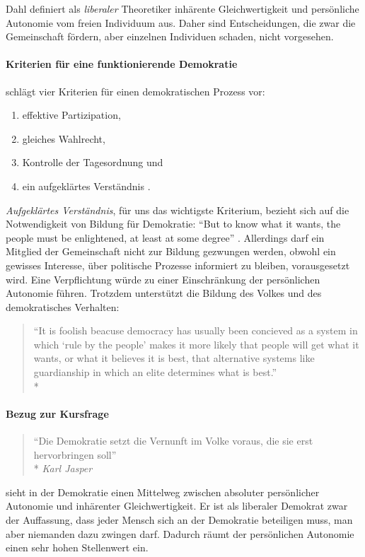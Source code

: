 Dahl definiert als \emph{liberaler} Theoretiker inhärente Gleichwertigkeit und persönliche Autonomie vom freien Individuum aus.
Daher sind Entscheidungen, die zwar die Gemeinschaft fördern, aber einzelnen Individuen schaden, nicht vorgesehen.


\paragraph{Kriterien für eine funktionierende Demokratie}

\citeauthor{Dahl-1989-aa} schlägt vier Kriterien für einen demokratischen Prozess vor:

\begin{enumerate}
	\item effektive Partizipation,
	\item gleiches Wahlrecht,
	\item Kontrolle der Tagesordnung und
	\item ein aufgeklärtes Verständnis \parencite[vgl.][100]{Dahl-1989-aa}.
\end{enumerate}

\emph{Aufgeklärtes Verständnis}, für uns das wichtigste Kriterium, bezieht sich auf die Notwendigkeit von Bildung für Demokratie:
``But to know what it wants, the people must be enlightened, at least at some degree'' \parencite[100]{Dahl-1989-aa}.
Allerdings darf ein Mitglied der Gemeinschaft nicht zur Bildung gezwungen werden, obwohl ein gewisses Interesse, über politische Prozesse informiert zu bleiben, vorausgesetzt wird.
Eine Verpflichtung würde zu einer Einschränkung der persönlichen Autonomie führen.
Trotzdem unterstützt \citeauthor{Dahl-1989-aa} die Bildung des Volkes und des demokratisches Verhalten:

\begin{quote}
	``It is foolish beacuse democracy has usually been concieved as a system in which `rule by the people' makes it more likely that people will get what it wants, or what it believes it is best, that alternative systems like guardianship in which an elite determines what is best.''\\*
	\textcite[111]{Dahl-1989-aa}
\end{quote}


\paragraph{Bezug zur Kursfrage}

\begin{quote}
	``Die Demokratie setzt die Vernunft im Volke voraus, die sie erst hervorbringen soll''\\*
	\emph{Karl Jasper}
\end{quote}

\citeauthor{Dahl-1989-aa} sieht in der Demokratie einen Mittelweg zwischen absoluter persönlicher Autonomie und inhärenter Gleichwertigkeit.
Er ist als liberaler Demokrat zwar der Auffassung, dass jeder Mensch sich an der Demokratie beteiligen muss, man aber niemanden dazu zwingen darf.
Dadurch räumt \citeauthor{Dahl-1989-aa} der persönlichen Autonomie einen sehr hohen Stellenwert ein.